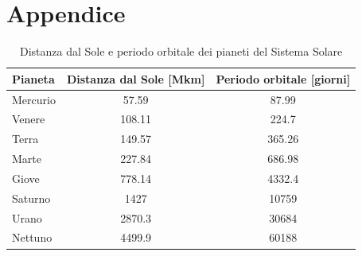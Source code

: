 \documentclass[letterpaper, 12pt]{article}
\numberwithin{equation}{section}    %
\begin{document}
\section{Appendice}
\begin{table}[!ht]
    \centering
    \caption{Distanza dal Sole e periodo orbitale dei pianeti del Sistema Solare}
    \label{tab:pianeti}
        \begin{tabular}{|l|c|c|}
        \hline
        \textbf{Pianeta} & \textbf{Distanza dal Sole [Mkm]} & \textbf{Periodo orbitale [giorni]} \\
        \hline
        Mercurio & 57.59   & 87.99   \\
        Venere   & 108.11  & 224.7   \\
        Terra    & 149.57  & 365.26  \\
        Marte    & 227.84  & 686.98  \\
        Giove    & 778.14  & 4332.4  \\
        Saturno  & 1427    & 10759   \\
        Urano    & 2870.3  & 30684   \\
        Nettuno  & 4499.9  & 60188   \\
        \hline
        \end{tabular}
\end{table}
\end{document}
